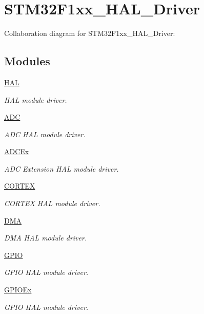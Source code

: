 \hypertarget{group__STM32F1xx__HAL__Driver}{}\section{S\+T\+M32\+F1xx\+\_\+\+H\+A\+L\+\_\+\+Driver}
\label{group__STM32F1xx__HAL__Driver}
Collaboration diagram for S\+T\+M32\+F1xx\+\_\+\+H\+A\+L\+\_\+\+Driver\+:
\subsection*{Modules}
\begin{DoxyCompactItemize}
\item 
\hyperlink{group__HAL}{H\+AL}
\begin{DoxyCompactList}\small\item\em H\+AL module driver. \end{DoxyCompactList}\item 
\hyperlink{group__ADC}{A\+DC}
\begin{DoxyCompactList}\small\item\em A\+DC H\+AL module driver. \end{DoxyCompactList}\item 
\hyperlink{group__ADCEx}{A\+D\+C\+Ex}
\begin{DoxyCompactList}\small\item\em A\+DC Extension H\+AL module driver. \end{DoxyCompactList}\item 
\hyperlink{group__CORTEX}{C\+O\+R\+T\+EX}
\begin{DoxyCompactList}\small\item\em C\+O\+R\+T\+EX H\+AL module driver. \end{DoxyCompactList}\item 
\hyperlink{group__DMA}{D\+MA}
\begin{DoxyCompactList}\small\item\em D\+MA H\+AL module driver. \end{DoxyCompactList}\item 
\hyperlink{group__GPIO}{G\+P\+IO}
\begin{DoxyCompactList}\small\item\em G\+P\+IO H\+AL module driver. \end{DoxyCompactList}\item 
\hyperlink{group__GPIOEx}{G\+P\+I\+O\+Ex}
\begin{DoxyCompactList}\small\item\em G\+P\+IO H\+AL module driver. \end{DoxyCompactList}\item 

\end{DoxyCompactItemize}
